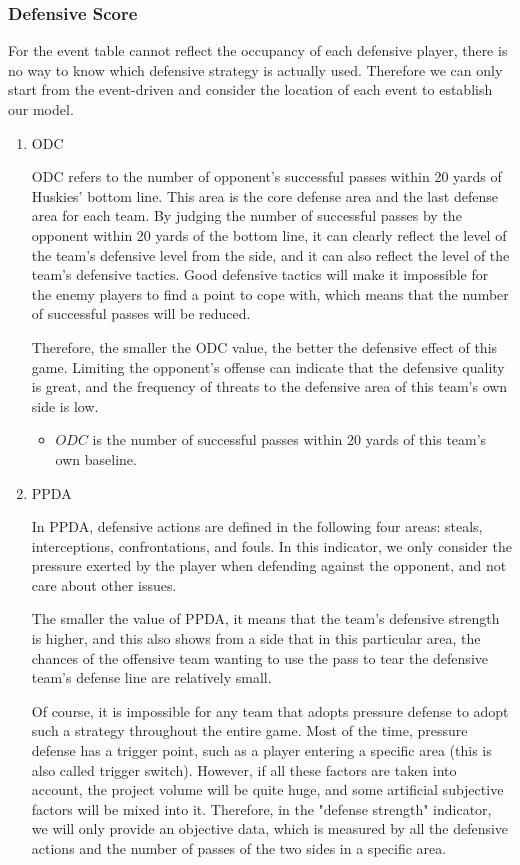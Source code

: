 \documentclass{mcmthesis}
\begin{document}
\subsubsection{Defensive Score}
	For the event table cannot reflect the occupancy of each defensive player, there is no way to know which defensive strategy is actually used. Therefore we can only start from the event-driven and consider the location of each event to establish our model.
	\begin{enumerate}
	\item ODC
	
	ODC refers to the number of opponent's successful passes within 20 yards of Huskies' bottom line. This area is the core defense area and the last defense area for each team.  By judging the number of successful passes by the opponent within 20 yards of the bottom line, it can clearly reflect the level of the team's defensive level from the side, and it can also reflect the level of the team's defensive tactics. Good defensive tactics will make it impossible for the enemy players to find a point to cope with, which means that the number of successful passes will be reduced.

	Therefore, the smaller the ODC value, the better the defensive effect of this game. Limiting the opponent's offense can indicate that the defensive quality is great, and the frequency of threats to the defensive area of ​​this team's own side is low.

	\begin{itemize}
		\item $ODC$ is the number of successful passes within 20 yards of this team's own baseline.
	\end{itemize}

	\item PPDA
	
	In PPDA, defensive actions are defined in the following four areas: steals, interceptions, confrontations, and fouls.  In this indicator, we only consider the pressure exerted by the player when defending against the opponent, and not care about other issues.

	The smaller the value of PPDA, it means that the team's defensive strength is higher, and this also shows from a side that in this particular area, the chances of the offensive team wanting to use the pass to tear the defensive team's defense line are relatively small.

	Of course, it is impossible for any team that adopts pressure defense to adopt such a strategy throughout the entire game. Most of the time, pressure defense has a trigger point, such as a player entering a specific area (this is also called trigger switch).  However, if all these factors are taken into account, the project volume will be quite huge, and some artificial subjective factors will be mixed into it.  Therefore, in the "defense strength" indicator, we will only provide an objective data, which is measured by all the defensive actions and the number of passes of the two sides in a specific area.


\end{enumerate}
\end{document}
